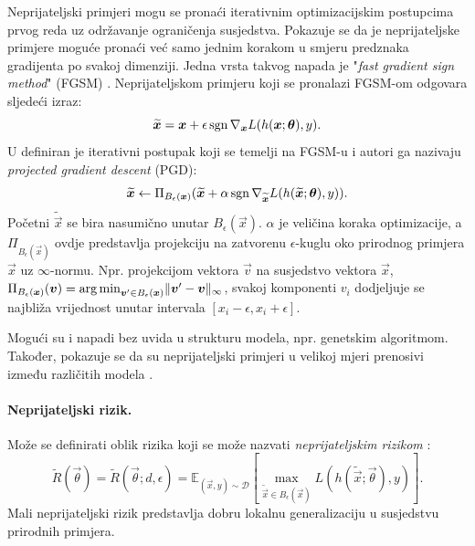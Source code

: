 \documentclass[utf8, seminar, numeric, lmodern]{feri}
\begin{document}
Neprijateljski primjeri mogu se pronaći iterativnim optimizacijskim postupcima prvog reda uz održavanje ograničenja susjedstva. Pokazuje se da je neprijateljske primjere moguće pronaći već samo jednim korakom u smjeru predznaka gradijenta po svakoj dimenziji. Jedna vrsta takvog napada je "\emph{fast gradient sign method}" (FGSM) \cite{goodfellow14-ehae}. Neprijateljskom primjeru koji se pronalazi FGSM-om odgovara sljedeći izraz:
\begin{equation}
\widetilde{\bm{x}} = \bm{x} + \epsilon\operatorname{sgn} \nabla_{\bm{x}} L(h(\bm{x};\bm{\theta}), y).
\end{equation}
U \cite{madry17-tdlmraa} definiran je iterativni postupak koji se temelji na FGSM-u i autori ga nazivaju \emph{projected gradient descent} (PGD):
\begin{equation} \label{eq:pgd}
\widetilde{\bm{x}} \gets \Pi_{B_\epsilon(\bm{x})} (\widetilde{\bm{x}} + \alpha\operatorname{sgn}\nabla_{\widetilde{\bm{x}}} L(h(\widetilde{\bm{x}};\bm{\theta}), y)).
\end{equation}
Početni $\tilde{\vec x}$ se bira nasumično unutar $B_\epsilon(\vec x)$. $\alpha$ je veličina koraka optimizacije, a $\Pi_{B_\epsilon(\vec x)}$ ovdje predstavlja projekciju na zatvorenu $\epsilon$-kuglu oko prirodnog primjera $\vec x$ uz $\infty$-normu. Npr. projekcijom vektora $\vec v$ na susjedstvo vektora $\vec x$, $\Pi_{B_\epsilon(\bm{x})}(\bm{v}) = \operatorname*{arg\,min}_{\bm{v}'\in B_\epsilon(\bm{x})}\lVert \bm{v}'-\bm{v}\rVert_\infty$, svakoj komponenti $v_i$ dodjeljuje se najbliža vrijednost unutar intervala $\left[x_i-\epsilon, x_i+\epsilon\right]$.

Mogući su i napadi bez uvida u strukturu modela, npr. genetskim algoritmom. Također, pokazuje se da su neprijateljski primjeri u velikoj mjeri prenosivi između različitih modela \cite{szegedy13-intrig-ipnn, goodfellow14-ehae, liu-dtaeba}.

\paragraph{Neprijateljski rizik.} Može se definirati oblik rizika koji se može nazvati \emph{neprijateljskim rizikom} \cite{madry17-tdlmraa}:
\begin{equation}\label{eq:adv-risk}
\widetilde{R}(\vec\theta) = \widetilde{R}(\vec\theta;d,\epsilon) = \mathbb{E}_{(\vec x,y)\sim\mathcal{D}}\left[
\max_{\widetilde{\vec x} \in B_\epsilon(\vec x)} L(h(\widetilde{\vec x};\vec\theta), y) \right].
\end{equation}
Mali neprijateljski rizik predstavlja dobru lokalnu generalizaciju u susjedstvu prirodnih primjera.
\end{document}
